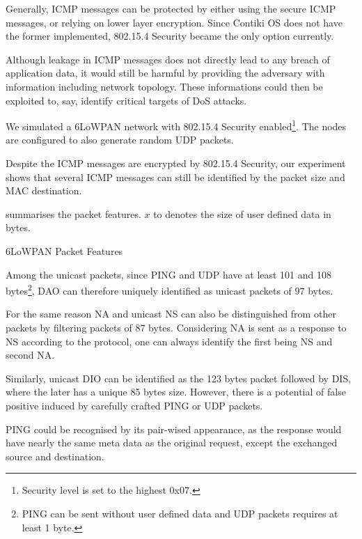 Generally, ICMP messages can be protected by either using the secure ICMP messages, or relying on lower layer encryption. Since Contiki OS does not have the former implemented, 802.15.4 Security became the only option currently.

Although leakage in ICMP messages does not directly lead to any breach of application data, it would still be harmful by providing the adversary with information including network topology. These informations could then be exploited to, say, identify critical targets of DoS attacks. 

We simulated a 6LoWPAN network with 802.15.4 Security enabled\footnote{Security level is set to the highest 0x07.}. The nodes are configured to also generate random UDP packets. 

Despite the ICMP messages are encrypted by 802.15.4 Security, our experiment shows that several ICMP messages can still be identified by the packet size and MAC destination. 

 summarises the packet features. $x$ to denotes the size of user defined data in bytes.

\begin{table}
	\center
	
	\caption{6LoWPAN Packet Features\label{IcmpPacketFeature}}
\end{table}


Among the unicast packets, since PING and UDP have at least 101 and 108 bytes\footnote{PING can be sent without user defined data and UDP packets requires at least 1 byte.}, DAO can therefore uniquely identified as unicast packets of $97$ bytes. 

For the same reason NA and unicast NS can also be distinguished from other packets by filtering packets of $87$ bytes. Considering NA is sent as a response to NS according to the protocol, one can always identify the first being NS and second NA. 

Similarly, unicast DIO can be identified as the 123 bytes packet followed by DIS, where the later has a unique 85 bytes size. However, there is a potential of false positive induced by carefully crafted PING or UDP packets.

PING could be recognised by its pair-wised appearance, as the response would have nearly the same meta data as the original request, except the exchanged source and destination.

